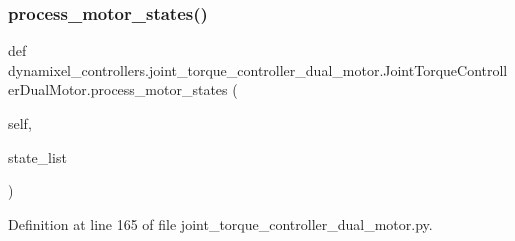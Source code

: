\subsubsection{\texorpdfstring{process\+\_\+motor\+\_\+states()}{process\_motor\_states()}}
{\footnotesize\ttfamily def dynamixel\+\_\+controllers.\+joint\+\_\+torque\+\_\+controller\+\_\+dual\+\_\+motor.\+Joint\+Torque\+Controller\+Dual\+Motor.\+process\+\_\+motor\+\_\+states (\begin{DoxyParamCaption}\item[{}]{self,  }\item[{}]{state\+\_\+list }\end{DoxyParamCaption})}



Definition at line 165 of file joint\+\_\+torque\+\_\+controller\+\_\+dual\+\_\+motor.\+py.



